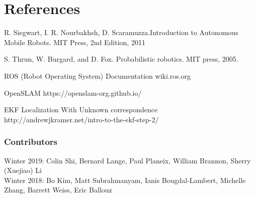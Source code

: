 \documentclass[twoside]{article}
\begin{document}
\section {References}
\begin{enumerate}[label={[\arabic*]}]
\item R. Siegwart, I. R. Nourbakhsh, D. Scaramuzza.Introduction to Autonomous Mobile Robots. MIT Press, 2nd Edition, 2011
\item S. Thrun, W. Burgard, and D. Fox. Probabilistic robotics. MIT press, 2005.
\item ROS (Robot Operating System) Documentation wiki.ros.org
\item OpenSLAM https://openslam-org.github.io/
\item EKF Localization With Unknown correspondence http://andrewjkramer.net/intro-to-the-ekf-step-2/


\subsubsection*{Contributors}
Winter 2019: Colin Shi, Bernard Lange, Paul Planeix, William Brannon, Sherry (Xuejiao) Li
\\
Winter 2018: Bo Kim, Matt Subrahmanyam, Ianis Bougdal-Lambert, Michelle Zhang, Barrett Weiss, Eric Ballouz


\end{enumerate}
\end{document}
